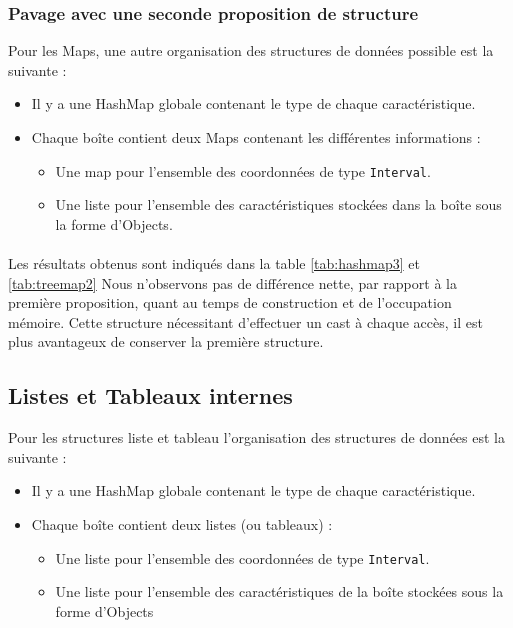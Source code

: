 \subsubsection{Pavage avec une seconde proposition de structure}
Pour les Maps, une autre organisation des structures de données possible est la suivante :
\begin{itemize}
\item Il y a une HashMap globale contenant le type de chaque caractéristique.
 \item Chaque boîte contient deux Maps contenant les différentes informations :
\begin{itemize}
 \item Une map pour l'ensemble des coordonnées de type \verb+Interval+.
\item Une liste pour l'ensemble des caractéristiques stockées dans la boîte sous la forme d'Objects.
\end{itemize}
\end{itemize}

\paragraph{}Les résultats obtenus sont indiqués dans la table \ref{tab:hashmap3} et \ref{tab:treemap2}
Nous n'observons pas de différence nette, par rapport à la première proposition, quant au temps de construction et de l'occupation mémoire. Cette structure nécessitant d'effectuer un cast à chaque accès, il est plus avantageux de conserver la première structure.



\subsection{Listes et Tableaux internes}
Pour les structures liste et tableau l'organisation des structures de données est la suivante :
\begin{itemize}
\item Il y a une HashMap globale contenant le type de chaque caractéristique.
 \item Chaque boîte contient deux listes (ou tableaux) :
\begin{itemize}
 \item Une liste pour l'ensemble des coordonnées de type \verb+Interval+.
\item Une liste pour l'ensemble des caractéristiques de la boîte stockées sous la forme d'Objects
\end{itemize}
\end{itemize}

